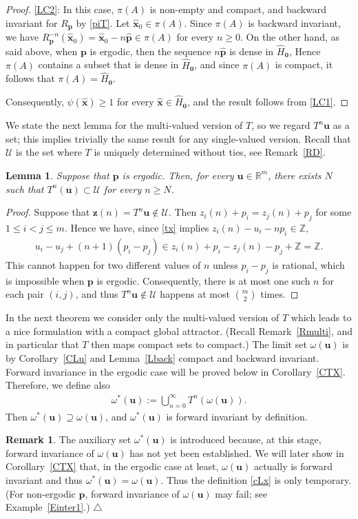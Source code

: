 \documentclass[11pt,reqno,tbtags,a4paper]{amsart}
\numberwithin{equation}{section}
\renewcommand\le{\leq}
\renewcommand\ge{\geq}
\renewcommand\leq{\leqslant}
\renewcommand\geq{\geqslant}
\theoremstyle{plain}%
\newtheorem{lemma}[theorem]{Lemma}
\theoremstyle{definition}
\newcommand\xqed[1]{%
    \leavevmode\unskip\penalty9999 \hbox{}\nobreak\hfill
    \quad\hbox{#1}}
\newtheorem{remarkqqq}[theorem]{Remark}
\newenvironment{remark}{\begin{remarkqqq}}
  {\xqed{$\triangle$}\end{remarkqqq}}
\theoremstyle{remark}
\newcommand\pfitemx[1]{\par#1:}
\newcommand\pfitemref[1]{\pfitemx{\ref{#1}}}
\newcommand{\refC}[1]{Corollary~\ref{#1}}
\newcommand{\refL}[1]{Lemma~\ref{#1}}
\newcommand{\refR}[1]{Remark~\ref{#1}}
\newcommand{\refE}[1]{Example~\ref{#1}}
\newcommand\bbR{\mathbb R}
\newcommand\bbZ{\mathbb Z}
\newcommand\cL{{\omega}}
\newcommand\cU{{\mathcal U}}
\newcommand\hHo{\hH_{\0}}
\newcommand\vp{\mathbf{p}}
\newcommand\hvp{\hat{\mathbf{p}}}
\newcommand\vu{\mathbf{u}}
\newcommand\vz{\mathbf{z}}
\newcommand\hvx{\hat{\mathbf{x}}}
\newcommand\Rp{R_\vp}
\newcommand\hH{\widehat{H}}
\newcommand\cLx{\cL^*}
\newcommand\0{{\boldsymbol 0}}
\newcommand\1{{\boldsymbol 1}}
\begin{document}
\begin{proof}
\pfitemref{LC2}
In this case, $\pi(A)$ is non-empty and compact, and backward
invariant for $\Rp$ by
\eqref{piT}. 
Let $\hvx_0\in\pi(A)$. Since $\pi(A)$ is backward invariant, we have
$\Rp^{-n}(\hvx_0)=\hvx_0-n\hvp\in\pi(A)$ for every $n\ge0$.
On the other hand, as said above, 
when $\vp$ is ergodic, 
then the sequence $n\hvp$ is
%
dense in $\hHo$, 
Hence $\pi(A)$ contains a subset that is dense in $\hHo$, 
and since $\pi(A)$ is compact, it follows that $\pi(A)=\hHo$.

Consequently, $\psi(\hvx)\ge1$ for every $\hvx\in\hHo$, and 
the result follows from \ref{LC1}.
\end{proof}

We state the next lemma for the multi-valued version of $T$, so we regard
$T^n\vu$ as a set; this implies trivially the same result for any
single-valued version.
Recall that $\cU$ is the set where $T$ is uniquely determined without ties,
see \refR{RD}.
\begin{lemma}\label{Luni}
Suppose that $\vp$ is ergodic. Then,
  for every $\vu\in\bbR^m$, there exists $N$ such that $T^n(\vu)\subset \cU$
  for every $n\ge N$.
\end{lemma}
\begin{proof}
  Suppose that $\vz(n)=T^n\vu\notin\cU$. Then $z_i(n)+p_i=z_j(n)+p_j$ for some
  $1\le i<j\le m$. 
Hence we have, since \eqref{tx} implies $z_i(n)-u_i-np_i\in\bbZ$, 
  \begin{align}\label{luni1}
u_i-u_j + (n+1)(p_i-p_j) 
%
\in z_i(n)+p_i-z_j(n)-p_j+\bbZ
= \bbZ.
  \end{align}
This cannot happen for two different values of $n$ unless $p_i-p_j$ is
rational, which is impossible when $\vp$ is ergodic.
Consequently, there is at most one such $n$ for each pair $(i,j)$, and thus
$T^n\vu\notin\cU$ happens at most $\binom m2$ times.
\end{proof}

In the next theorem we consider only the multi-valued version of $T$ which 
leads to a nice formulation with a compact global attractor. 
(Recall \refR{Rmulti}, and
in particular that $T$ then maps compact sets to compact.)
The limit set $\cL(\vu)$ is by 
\refC{CLu} and \refL{Lback} 
compact and
backward invariant. Forward invariance in the ergodic case will be
proved below in \refC{CTX}.
%
%
%
Therefore, we define also
\begin{align}\label{cLx}
  \cLx(\vu):=\bigcup_{n=0}^\infty T^n(\cL(\vu))
.\end{align}
Then $\cLx(\vu)\supseteq\cL(\vu)$, and
$\cLx(\vu)$ is forward invariant by definition. 
\begin{remark}\label{RPinv}
The auxiliary set $\cLx(\vu)$ is introduced because, at this stage,
forward invariance of $\cL(\vu)$ has not yet been established.
We will later show in \refC{CTX} that,
in the ergodic case at least, %
$\cL(\vu)$ actually is forward invariant and thus
$\cLx(\vu)=\cL(\vu)$.
Thus the definition \eqref{cLx} 
is only temporary.
(For non-ergodic $\vp$, forward invariance of $\cL(\vu)$ may fail;
see \refE{Einter1}.)
\end{remark}
\end{document}
